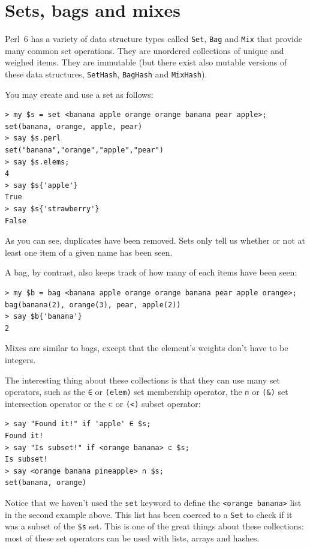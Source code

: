 \section{Sets, bags and mixes}
\label{sets_and_bags}


Perl~6 has a variety of data structure types called {\tt Set}, 
{\tt Bag} and {\tt Mix} that provide many common set 
operations. They are unordered collections of unique and 
weighed items. They are immutable (but there exist also mutable 
versions of these data structures, {\tt SetHash}, {\tt BagHash} 
and {\tt MixHash}).

You may create and use a set as follows:

\begin{verbatim}
> my $s = set <banana apple orange orange banana pear apple>;
set(banana, orange, apple, pear)
> say $s.perl
set("banana","orange","apple","pear")
> say $s.elems;
4
> say $s{'apple'}
True
> say $s{'strawberry'}
False
\end{verbatim}
%
As you can see, duplicates have been removed. Sets only tell us 
whether or not at least one item of a given name has been seen.

A bag, by contrast, also keeps track of how many of each items 
have been seen:

\begin{verbatim}
> my $b = bag <banana apple orange orange banana pear apple orange>;
bag(banana(2), orange(3), pear, apple(2))
> say $b{'banana'}
2
\end{verbatim} 

Mixes are similar to bags, except that the element's weights don't 
have to be integers.

The interesting thing about these collections is that they can use 
many set operators, such as the \verb'∈' or \verb'(elem)' 
set membership operator, the \verb'∩' or \verb'(&)' set intersection 
operator or the \verb'⊂' or \verb'(<)' subset operator:

\begin{verbatim}
> say "Found it!" if 'apple' ∈ $s;
Found it!
> say "Is subset!" if <orange banana> ⊂ $s;
Is subset!
> say <orange banana pineapple> ∩ $s;
set(banana, orange)
\end{verbatim}

Notice that we haven't used the {\tt set} keyword to define 
the \verb'<orange banana>' list in the second example above. 
This list has been coerced to a {\tt Set} to check if it was a subset 
of the \verb'$s' set. This is one of the great things about these 
collections: most of these set operators can be used with lists, 
arrays and hashes.

